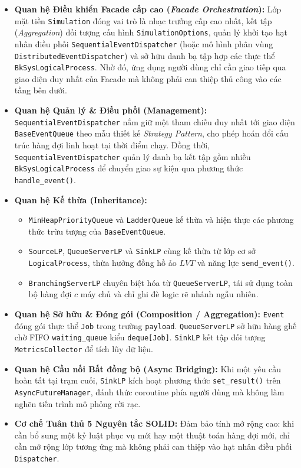 \begin{itemize}[leftmargin=1.5em, itemsep=4pt]
\item \textbf{Quan hệ Điều khiển Facade cấp cao (\textit{Facade Orchestration}):} Lớp mặt tiền \texttt{Simulation} đóng vai trò là nhạc trưởng cấp cao nhất, kết tập (\textit{Aggregation}) đối tượng cấu hình \texttt{SimulationOptions}, quản lý khởi tạo hạt nhân điều phối \texttt{SequentialEventDispatcher} (hoặc mô hình phân vùng \texttt{DistributedEventDispatcher}) và sở hữu danh bạ tập hợp các thực thể \texttt{BkSysLogicalProcess}. Nhờ đó, ứng dụng người dùng chỉ cần giao tiếp qua giao diện duy nhất của Facade mà không phải can thiệp thủ công vào các tầng bên dưới.
\item \textbf{Quan hệ Quản lý \& Điều phối (Management):} \texttt{SequentialEventDispatcher} nắm giữ một tham chiếu duy nhất tới giao diện \texttt{BaseEventQueue} theo mẫu thiết kế \textit{Strategy Pattern}, cho phép hoán đổi cấu trúc hàng đợi linh hoạt tại thời điểm chạy. Đồng thời, \texttt{SequentialEventDispatcher} quản lý danh bạ kết tập gồm nhiều \texttt{BkSysLogicalProcess} để chuyển giao sự kiện qua phương thức \texttt{handle\_event()}.
\item \textbf{Quan hệ Kế thừa (Inheritance):} 
\begin{itemize}[leftmargin=1.2em, itemsep=2pt]
\item \texttt{MinHeapPriorityQueue} và \texttt{LadderQueue} kế thừa và hiện thực các phương thức trừu tượng của \texttt{BaseEventQueue}.
\item \texttt{SourceLP}, \texttt{QueueServerLP} và \texttt{SinkLP} cùng kế thừa từ lớp cơ sở \texttt{LogicalProcess}, thừa hưởng đồng hồ ảo $LVT$ và năng lực \texttt{send\_event()}.
\item \texttt{BranchingServerLP} chuyên biệt hóa từ \texttt{QueueServerLP}, tái sử dụng toàn bộ hàng đợi $c$ máy chủ và chỉ ghi đè logic rẽ nhánh ngẫu nhiên.
\end{itemize}
\item \textbf{Quan hệ Sở hữu \& Đóng gói (Composition / Aggregation):} \texttt{Event} đóng gói thực thể \texttt{Job} trong trường \texttt{payload}. \texttt{QueueServerLP} sở hữu hàng ghế chờ FIFO \texttt{waiting\_queue} kiểu \texttt{deque[Job]}. \texttt{SinkLP} kết tập đối tượng \texttt{MetricsCollector} để tích lũy dữ liệu.
\item \textbf{Quan hệ Cầu nối Bất đồng bộ (Async Bridging):} Khi một yêu cầu hoàn tất tại trạm cuối, \texttt{SinkLP} kích hoạt phương thức \texttt{set\_result()} trên \texttt{AsyncFutureManager}, đánh thức coroutine phía người dùng mà không làm nghẽn tiến trình mô phỏng rời rạc.
\item \textbf{Cơ chế Tuân thủ 5 Nguyên tắc SOLID:} Đảm bảo tính mở rộng cao: khi cần bổ sung một kỷ luật phục vụ mới hay một thuật toán hàng đợi mới, chỉ cần mở rộng lớp tương ứng mà không phải can thiệp vào hạt nhân điều phối \texttt{Dispatcher}.
\end{itemize}


